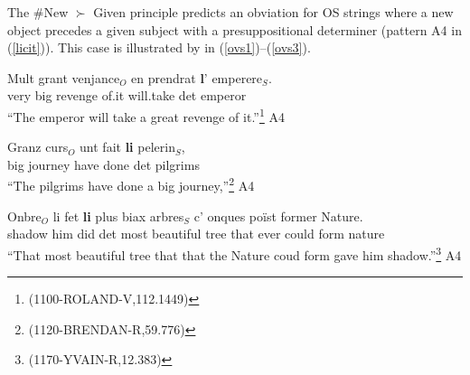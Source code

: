 \documentclass[output=paper,modfonts,nonflat]{langsci/langscibook}
\begin{document}

The \#New $\succ$ Given principle predicts an obviation for OS strings where a new object precedes a given subject with a presuppositional determiner (pattern A4 in (\ref{licit})). This case is illustrated by in (\ref{ovs1})--(\ref{ovs3}).

\ea
\gll Mult grant venjance$_{O}$ en prendrat {\bf l}' emperere$_{S}$.\\
very big revenge of.it will.take {\sc det} emperor\\
\glt ``The emperor will take a great revenge of it.''\footnote{\scriptsize (1100-ROLAND-V,112.1449)}\label{ovs1} \hfill A4
\z



\ea
\gll Granz curs$_{O}$ unt fait {\bf li} pelerin$_{S}$,\\
big journey have done {\sc det} pilgrims\\
\glt ``The pilgrims have done a big journey,''\footnote{\scriptsize (1120-BRENDAN-R,59.776)}\label{ovs2} \hfill A4
\z

\ea
\gll Onbre$_{O}$ li fet {\bf li} plus biax arbres$_{S}$ c' onques po\"{i}st former Nature.\\
shadow him did {\sc det} most beautiful tree that ever could form nature\\
\glt ``That most beautiful tree that that the Nature coud form gave him shadow.''\footnote{\scriptsize (1170-YVAIN-R,12.383)}\label{ovs3} \hfill A4
\z


\end{document}

